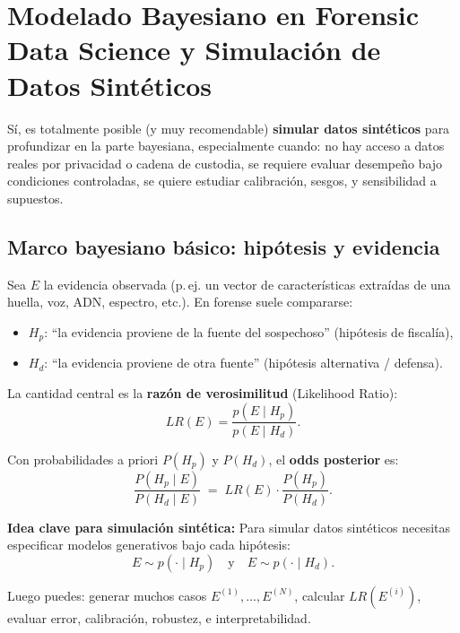 \documentclass[a4paper,10pt,oneside]{article}
\begin{document}
\section{Modelado Bayesiano en Forensic Data Science y Simulaci\'on de Datos Sint\'eticos}

S\'i, es totalmente posible (y muy recomendable) \textbf{simular datos sint\'eticos} para profundizar en la parte bayesiana, especialmente cuando: no hay acceso a datos reales por privacidad o cadena de custodia, se requiere evaluar desempe\~no bajo condiciones controladas, se quiere estudiar calibraci\'on, sesgos, y sensibilidad a supuestos.


\subsection{Marco bayesiano b\'asico: hip\'otesis y evidencia}

Sea $E$ la evidencia observada (p.\,ej. un vector de caracter\'isticas extra\'idas de una huella, voz, ADN, espectro, etc.). En forense suele compararse:
\begin{itemize}
\item $H_p$: ``la evidencia proviene de la fuente del sospechoso'' (hip\'otesis de fiscal\'ia),
\item $H_d$: ``la evidencia proviene de otra fuente'' (hip\'otesis alternativa / defensa).
\end{itemize}

La cantidad central es la \textbf{raz\'on de verosimilitud} (Likelihood Ratio):
\begin{equation}
LR(E)=\frac{p(E\mid H_p)}{p(E\mid H_d)}.
\end{equation}

Con probabilidades a priori $P(H_p)$ y $P(H_d)$, el \textbf{odds posterior} es:
\begin{equation}
\frac{P(H_p\mid E)}{P(H_d\mid E)} \;=\; LR(E)\cdot \frac{P(H_p)}{P(H_d)}.
\end{equation}

\textbf{Idea clave para simulaci\'on sint\'etica:} Para simular datos sint\'eticos necesitas especificar modelos generativos bajo cada hip\'otesis:
\[
E \sim p(\cdot\mid H_p)\quad\text{y}\quad E \sim p(\cdot\mid H_d).
\]

Luego puedes: generar muchos casos $E^{(1)},\dots,E^{(N)}$, calcular $LR(E^{(i)})$, evaluar error, calibraci\'on, robustez, e interpretabilidad.
\end{document}
